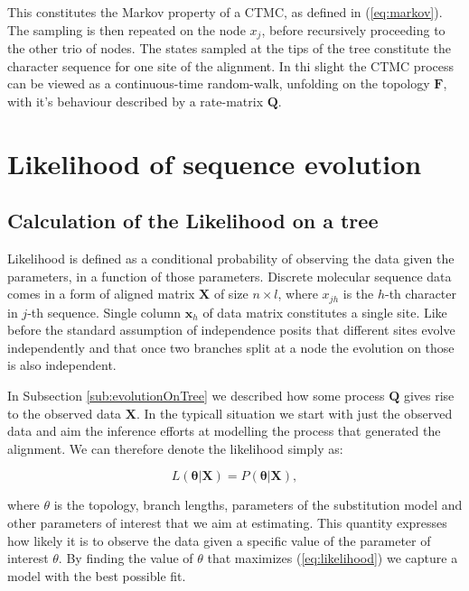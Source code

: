 \documentclass[12pt,twoside]{mitthesis}
\theoremstyle{plain}
\theoremstyle{definition}
\theoremstyle{remark}
\begin{document}
This constitutes the Markov property of a CTMC, as defined in (\ref{eq:markov}).
The sampling is then repeated on the node $x_j$, before recursively proceeding to the other trio of nodes.
The states sampled at the tips of the tree constitute the character sequence for one site of the alignment.
In thi slight the CTMC process can be viewed as a continuous-time random-walk, unfolding on the topology $\mathbf{F}$, with it's behaviour described by a rate-matrix $\mathbf{Q}$.

\section{Likelihood of sequence evolution}

\subsection{Calculation of the Likelihood on a tree\label{sub:likelihood}}

Likelihood is defined as a conditional probability of observing the data given the parameters, in a function of those parameters.
Discrete molecular sequence data comes in a form of aligned matrix $\mathbf{X}$ of size $n \times l$, where $x_{jh}$ is the $h$-th character in $j$-th sequence.
Single column $\mathbf{x}_{h}$ of data matrix constitutes a single site.
Like before the standard assumption of independence posits that different sites evolve independently and that once two branches split at a node the evolution on those is also independent.

In Subsection \ref{sub:evolutionOnTree} we described how some process $\mathbf{Q}$ gives rise to the observed data $\mathbf{X}$.
In the typicall situation we start with just the observed data and aim the inference efforts at modelling the process that generated the alignment.
We can therefore denote the likelihood simply as: 

\begin{equation}
L\left(\mathbf{\theta}|\mathbf{X}\right)=P\left(\mathbf{\theta}|\mathbf{X}\right), 
\label{eq:likelihood}
\end{equation}

\noindent
where $\theta$ is the topology, branch lengths, parameters of the substitution model and other parameters of interest that we aim at estimating.
This quantity expresses how likely it is to observe the data given a specific value of the parameter of interest $\theta$.
By finding the value of $\theta$ that maximizes (\ref{eq:likelihood}) we capture a model with the best possible fit.
\end{document}
